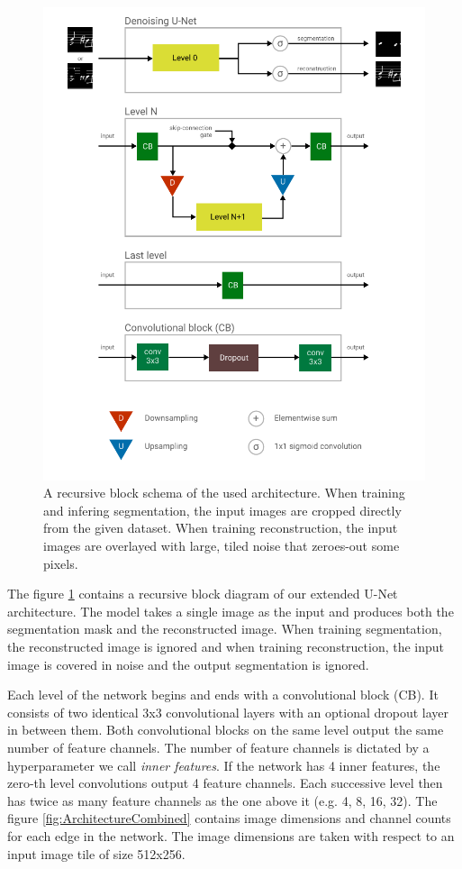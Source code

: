 \begin{figure}[p]
    \centering
    \includegraphics[width=140mm]{../img/architecture-pieces.pdf}
    \caption{A recursive block schema of the used architecture. When training and infering segmentation, the input images are cropped directly from the given dataset. When training reconstruction, the input images are overlayed with large, tiled noise that zeroes-out some pixels.}
    \label{fig:ArchitecturePieces}
\end{figure}

The figure \ref{fig:ArchitecturePieces} contains a recursive block diagram of our extended U-Net architecture. The model takes a single image as the input and produces both the segmentation mask and the reconstructed image. When training segmentation, the reconstructed image is ignored and when training reconstruction, the input image is covered in noise and the output segmentation is ignored.

Each level of the network begins and ends with a convolutional block (CB). It consists of two identical 3x3 convolutional layers with an optional dropout layer in between them. Both convolutional blocks on the same level output the same number of feature channels. The number of feature channels is dictated by a hyperparameter we call \emph{inner features}. If the network has 4 inner features, the zero-th level convolutions output 4 feature channels. Each successive level then has twice as many feature channels as the one above it (e.g. 4, 8, 16, 32). The figure \ref{fig:ArchitectureCombined} contains image dimensions and channel counts for each edge in the network. The image dimensions are taken with respect to an input image tile of size 512x256.

